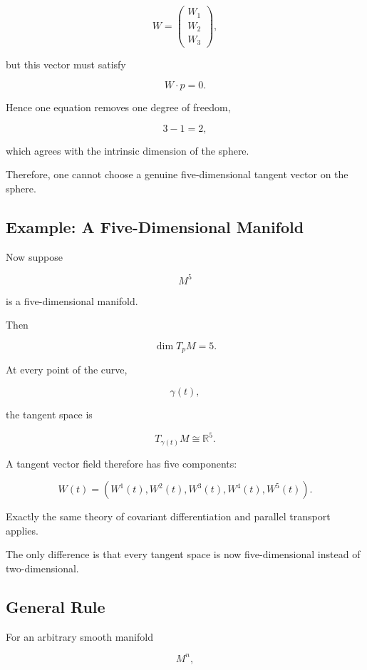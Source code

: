 \documentclass[12pt,a4paper]{article}
\theoremstyle{notespace}
\begin{document}
\[
W
=
\begin{pmatrix}
	W_1\\
	W_2\\
	W_3
\end{pmatrix},
\]

but this vector must satisfy

\[
W\cdot p=0.
\]

Hence one equation removes one degree of freedom,

\[
3-1=2,
\]

which agrees with the intrinsic dimension of the sphere.

Therefore, one cannot choose a genuine five-dimensional tangent vector on
the sphere.


\subsection{Example: A Five-Dimensional Manifold}

Now suppose

\[
M^5
\]

is a five-dimensional manifold.

Then

\[
\boxed{
	\dim T_pM=5.
}
\]

At every point of the curve,

\[
\gamma(t),
\]

the tangent space is

\[
T_{\gamma(t)}M
\cong
\mathbb R^5.
\]

A tangent vector field therefore has five components:

\[
\boxed{
	W(t)
	=
	\left(
	W^1(t),
	W^2(t),
	W^3(t),
	W^4(t),
	W^5(t)
	\right).
}
\]

Exactly the same theory of covariant differentiation and parallel
transport applies.

The only difference is that every tangent space is now
five-dimensional instead of two-dimensional.


\subsection{General Rule}

For an arbitrary smooth manifold

\[
M^n,
\]
\end{document}
